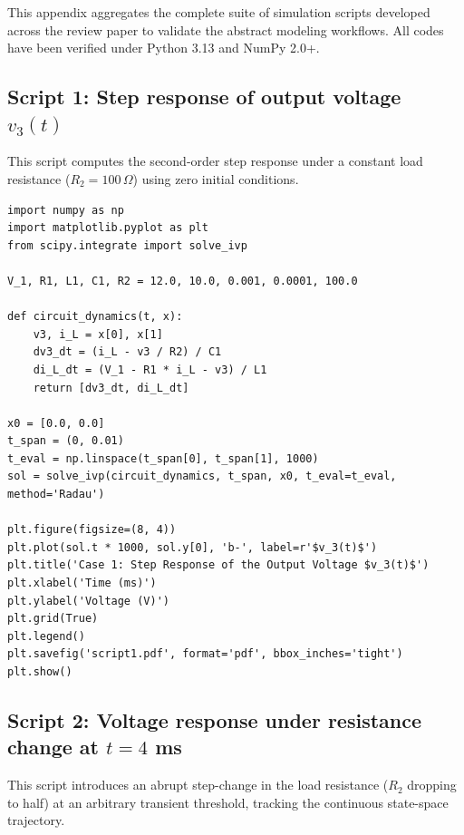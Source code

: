 \documentclass[energies,accept,oneauthor,pdftex]{Definitions/mdpi}
\begin{document}
This appendix aggregates the complete suite of simulation scripts developed across the review paper to validate the abstract modeling workflows. All codes have been verified under Python 3.13 and NumPy 2.0+.


\subsection*{Script 1: Step response of output voltage $v_3(t)$}
This script computes the second-order step response under a constant load resistance ($R_2 = 100\,\Omega$) using zero initial conditions.

{\footnotesize

\begin{verbatim}
import numpy as np
import matplotlib.pyplot as plt
from scipy.integrate import solve_ivp

V_1, R1, L1, C1, R2 = 12.0, 10.0, 0.001, 0.0001, 100.0

def circuit_dynamics(t, x):
    v3, i_L = x[0], x[1]
    dv3_dt = (i_L - v3 / R2) / C1
    di_L_dt = (V_1 - R1 * i_L - v3) / L1
    return [dv3_dt, di_L_dt]

x0 = [0.0, 0.0]
t_span = (0, 0.01)
t_eval = np.linspace(t_span[0], t_span[1], 1000)
sol = solve_ivp(circuit_dynamics, t_span, x0, t_eval=t_eval, method='Radau')

plt.figure(figsize=(8, 4))
plt.plot(sol.t * 1000, sol.y[0], 'b-', label=r'$v_3(t)$')
plt.title('Case 1: Step Response of the Output Voltage $v_3(t)$')
plt.xlabel('Time (ms)')
plt.ylabel('Voltage (V)')
plt.grid(True)
plt.legend()
plt.savefig('script1.pdf', format='pdf', bbox_inches='tight')
plt.show()
\end{verbatim}
}


\subsection*{Script 2: Voltage response under resistance change at $t=4$ ms}
This script introduces an abrupt step-change in the load resistance ($R_2$ dropping to half) at an arbitrary transient threshold, tracking the continuous state-space trajectory.
\end{document}
